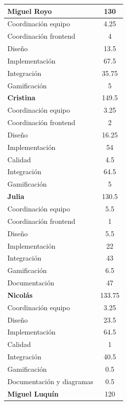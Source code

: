 \documentclass[11pt]{article}
\begin{document}
\begin{center}
\begin{longtable}{|l|S[table-format=3.2]|}
				\hline 
				\textbf{Miguel Royo} & 130 \\ 
				\hline
				Coordinación equipo & 4.25 \\
				\hline
				Coordinación frontend & 4 \\
				\hline
				Diseño & 13.5 \\
				\hline
				Implementación & 67.5 \\ 
				\hline
				Integración & 35.75 \\ 
				\hline
				Gamificación & 5 \\ 
				\hline
				\hline
				\textbf{Cristina} & 149.5 \\ 
				\hline
				Coordinación equipo & 3.25 \\
				\hline
				Coordinación frontend & 2 \\
				\hline
				Diseño & 16.25 \\
				\hline
				Implementación & 54 \\ 
				\hline
				Calidad & 4.5 \\
				\hline 
				Integración & 64.5 \\ 
				\hline
				Gamificación & 5 \\ 
				\hline
				\hline
				\textbf{Julia} & 130.5 \\ 
				\hline
				Coordinación equipo & 5.5 \\
				\hline
				Coordinación frontend & 1 \\
				\hline
				Diseño & 5.5 \\
				\hline
				Implementación & 22 \\ 
				\hline
				Integración & 43 \\ 
				\hline
				Gamificación & 6.5 \\ 
				\hline
				Documentación & 47 \\
				\hline
				\hline
				\textbf{Nicolás} & 133.75 \\ 
				\hline
				Coordinación equipo & 3.25 \\
				\hline
				Diseño & 23.5 \\
				\hline
				Implementación & 64.5 \\ 
				\hline
				Calidad & 1 \\
				\hline 
				Integración & 40.5 \\ 
				\hline
				Gamificación & 0.5 \\ 
				\hline
				Documentación y diagramas & 0.5 \\
				\hline
				\hline
				\textbf{Miguel Luquín} & 120 \\ 

\end{longtable}
\end{center}
\end{document}
